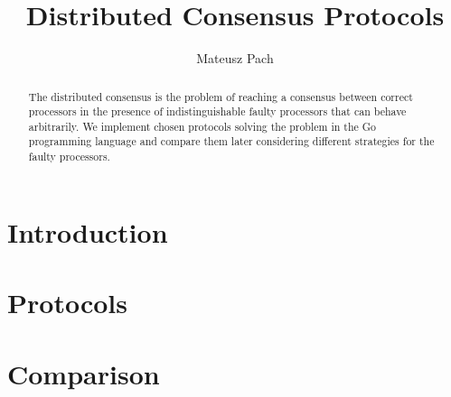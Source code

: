 \documentclass [11pt]{report}
\title{Distributed Consensus Protocols}
\author{Mateusz Pach}
\begin{document}


\begin{abstract}
    The distributed consensus is the problem of reaching a consensus between correct processors in the presence of indistinguishable faulty processors that can behave arbitrarily. We implement chosen protocols solving the problem in the Go programming language and compare them later considering different strategies for the faulty processors.
\end{abstract}

\listofalgorithms
\tableofcontents

\chapter{Introduction}


\chapter{Protocols}


\chapter{Comparison}


\medskip

\printbibliography
\end{document}
